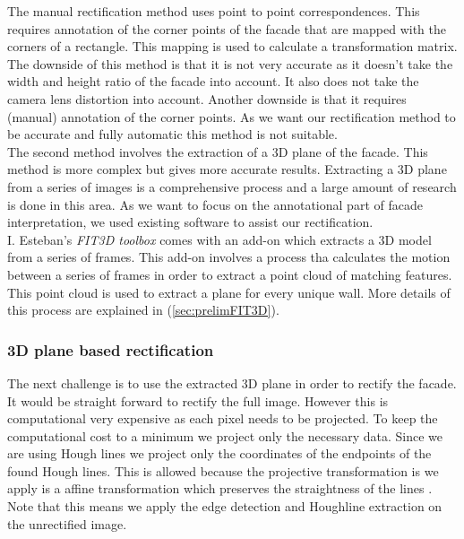 The manual rectification method uses point to point correspondences. This 
requires annotation of the corner points of the facade that are mapped with the
corners of a rectangle. This mapping is used to calculate a transformation matrix. 
 The downside of this method is that it is not very accurate as it doesn't take
 the width and height ratio of the facade into account.
It also does not take the camera lens distortion into account.
 Another downside is that it requires (manual) annotation of the corner points.
As we want our rectification method to be accurate and fully automatic this
method is not suitable.\\

The second method involves the extraction of a 3D plane of the facade.  This
method is more complex but gives more accurate results.  Extracting a 3D plane
from a series of images is a comprehensive process and a large amount of
research is done in this area.  As we want to focus on the annotational part of
facade interpretation, we used existing software to assist our rectification.\\

I. Esteban's \emph{FIT3D toolbox} \cite{FIT3D} comes with an add-on which
extracts a 3D model from a series of frames.  This add-on involves a process tha
calculates the motion between a series of frames in order to extract a point
cloud of matching features. This point cloud is used to extract a plane for
every unique wall.  More details of this process are explained in
(\ref{sec:prelimFIT3D}).


\subsubsection{3D plane based rectification} 
The next challenge is to use the extracted 3D plane in order to rectify the facade.
It would be straight forward to rectify the full image. However this is
computational very expensive as each pixel needs to be projected. To keep the
computational cost to a minimum we project only the necessary data. Since we
are using Hough lines we project only the coordinates of the endpoints of the found Hough lines. 
This is allowed because the projective transformation is we apply is a affine
transformation which preserves the
straightness of the lines \cite{linearalgebra}. Note that this means we apply the edge detection and
Houghline extraction on the unrectified image.\\

